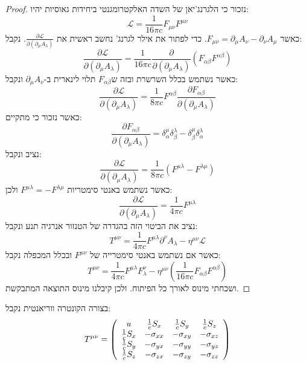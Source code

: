 \documentclass{tstextbook}
\begin{document}
\begin{proof}
נזכור כי הלגרנג'יאן של השדה האלקטרומגנטי ביחידות גאוסיות יהיו:
$${\mathcal{L}}={\frac{1}{16\pi c}}F_{\mu\nu}F^{\mu\nu}$$
כאשר \(F_{\mu\nu}=\partial_{\mu}A_{\nu}-\partial_{\nu}A_{\mu}\). כדי לפתור את אילר לגרנג' נחשב ראשית את \(\frac{\partial{\mathcal{L}}}{\partial(\partial_{\mu}A_{\lambda})}\). נקבל:
$$\frac{\partial\mathcal{L}}{\partial(\partial_{\mu}A_{\lambda})}=\frac{1}{16\pi c}\frac{\partial}{\partial(\partial_{\mu}A_{\lambda})}(F_{\alpha\beta}F^{\alpha\beta})$$
כאשר נשתמש בכלל השרשרת ובזה ש\(F_{\alpha \beta}\) תלוי לינארית ב-\(\partial_{\mu}A_{\nu}\) ונקבל:
$$\frac{\partial\mathcal{L}}{\partial(\partial_{\mu}A_{\lambda})}=\frac{1}{8\pi c}F^{\alpha\beta}\frac{\partial F_{\alpha\beta}}{\partial(\partial_{\mu}A_{\lambda})}$$
כאשר נזכור כי מתקיים:
$$\frac{\partial F_{\alpha\beta}}{\partial(\partial_{\mu}A_{\lambda})}=\delta_{\alpha}^{\mu}\delta_{\beta}^{\lambda}-\delta_{\beta}^{\mu}\delta_{\alpha}^{\lambda}$$
נציב ונקבל:
$$\frac{\partial\mathcal{L}}{\partial(\partial_{\mu}A_{\lambda})}=\frac{1}{8\pi c}(F^{\mu\lambda}-F^{\lambda\mu})$$
כאשר נשתמש באנטי סימטריות \(F^{\mu \lambda}=-F^{\lambda \mu}\) ולכן:
$$\frac{\partial\mathcal{L}}{\partial(\partial_{\mu}A_{\lambda})}=\frac{1}{4\pi c}F^{\mu\lambda}$$
נציב את הביטוי הזה בהגדרה של הטנזור אנרגיה תנע ונקבל:
$$T^{\mu\nu}={\frac{1}{4\pi c}}F^{\mu\lambda}\partial^{\nu}A_{\lambda}-\eta^{\mu\nu}{\mathcal{L}}$$
כאשר אם נשתמש באנטי סימטרייה של \(F^{\mu \nu}\) ובכלל המכפלה נקבל:
$$T^{\mu\nu}={\frac{1}{4\pi c}}F^{\mu\lambda}F_{\lambda}^{\nu}-\eta^{\mu\nu}\left({\frac{1}{16\pi c}}F_{\alpha\beta}F^{\alpha\beta}\right)$$
ושכחתי מינוס לאורך כל הפיתוח. ולכן קיבלנו מינוס התוצאה המתבקשת.

\end{proof}
\begin{proposition}
בצורה הקונטרה ווריאנטית נקבל:
$$T^{\mu\nu}=\left(\begin{array}{c c c c}u&{{{\frac{1}{c}}S_{x}}}&{{{\frac{1}{c}}S_{y}}}&{{{\frac{1}{c}}S_{z}}}\\ {{{\frac{1}{c}}S_{x}}}&{{-\sigma_{x x}}}&{{-\sigma_{x y}}}&{{-\sigma_{x z}}}\\ {{{\frac{1}{c}}S_{y}}}&{{-\sigma_{y x}}}&{{-\sigma_{y y}}}&{{-\sigma_{y z}}}\\ {{{\frac{1}{c}}S_{z}}}&{{-\sigma_{z x}}}&{{-\sigma_{z y}}}&{{-\sigma_{z z}}}\end{array}\right)$$

\end{proposition}
\end{document}
